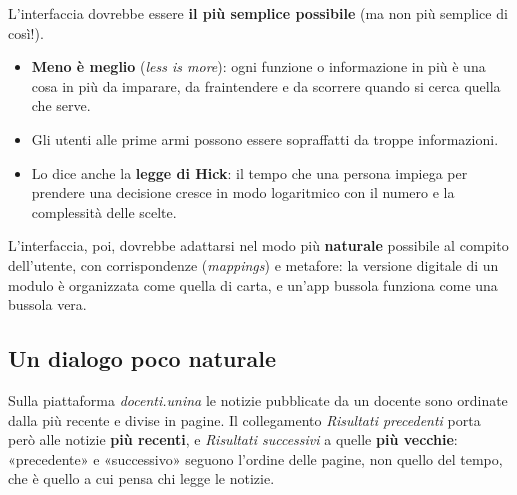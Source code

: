 L'interfaccia dovrebbe essere \textbf{il più semplice possibile} (ma non più semplice di così!).

\begin{itemize}
  \item \textbf{Meno è meglio} (\textit{less is more}): ogni funzione o informazione in più è una cosa in più da
        imparare, da fraintendere e da scorrere quando si cerca quella che serve.
  \item Gli utenti alle prime armi possono essere sopraffatti da troppe informazioni.
  \item Lo dice anche la \textbf{legge di Hick}: il tempo che una persona impiega per prendere una decisione cresce in
        modo logaritmico con il numero e la complessità delle scelte.
\end{itemize}


L'interfaccia, poi, dovrebbe adattarsi nel modo più \textbf{naturale} possibile al compito dell'utente, con
corrispondenze (\textit{mappings}) e metafore: la versione digitale di un modulo è organizzata come quella di carta, e
un'app bussola funziona come una bussola vera.


\subsection{Un dialogo poco naturale}

Sulla piattaforma \textit{docenti.unina} le notizie pubblicate da un docente sono ordinate dalla più recente e divise
in pagine. Il collegamento \textit{Risultati precedenti} porta però alle notizie \textbf{più recenti}, e \textit{Risultati
successivi} a quelle \textbf{più vecchie}: «precedente» e «successivo» seguono l'ordine delle pagine, non quello del
tempo, che è quello a cui pensa chi legge le notizie.

